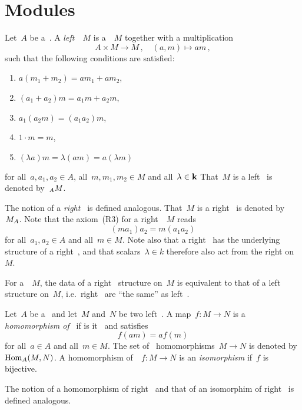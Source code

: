 \section{Modules}


\begin{definition}
  Let~$A$ be a~{\kalg}.
  A \emph{left~{}}~$M$ is a~{\module{$\kf$}}~$M$ together with a multiplication
  \[
            A \times M
    \to     M \,,
    \quad   (a,m)
    \mapsto am \,,
  \]
  such that the following conditions are satisfied:
  \begin{enumerate}[label={(L\arabic*})]
    \item
      $a(m_1 + m_2) = am_1 + am_2$,
    \item
      $(a_1 + a_2) m = a_1 m + a_2 m$,
    \item
      \label{module associative}
      $a_1 (a_2 m) = (a_1 a_2) m$,
    \item
      $1 \cdot m = m$,
    \item
      $(\lambda a)m = \lambda (am) = a (\lambda m)$
  \end{enumerate}
  for all~$a, a_1, a_2 \in A$, all~$m, m_1, m_2 \in M$ and all~$\lambda \in \mathbf{k}$
  That~$M$ is a left~{} is denoted by~$\indmodule[A]{M}$.
  
  The notion of a \emph{right~{}} is defined analogous.
  That~$M$ is a right~{} is denoted by~$\indmodule{M}[A]$.
  Note that the axiom~(R3) for a right~{}~$M$ reads
  \[
      (m a_1) a_2
    = m (a_1 a_2)
  \]
  for all~$a_1, a_2 \in A$ and all~$m \in M$.
  Note also that a right~{} has the underlying structure of a right~{\module{$\kf$}}, and that scalars~$\lambda \in k$ therefore also act from the right on~$M$.
\end{definition}


\begin{remark}
  For a~{\module{$\kf$}}~$M$, the data of a right~{} structure on~$M$ is equivalent to that of a left~{} structure on~$M$, i.e.\ right~{} are \enquote{the same} as left~{}.
\end{remark}


\begin{definition}
  Let~$A$ be a~{\kalg} and let~$M$ and~$N$ be two left~{}.
  A map~$f \colon M \to N$ is a \emph{homomorphism of~{}} if is it~{\klin} and satisfies
  \[
      f(am)
    = a f(m)
  \]
  for all~$a \in A$ and all~$m \in M$.
  The set of~{} homomorphisms~$M \to N$ is denoted by~$\operatorname{Hom}_A(M,N)$.
  A homomorphism of~{}~$f \colon M \to N$ is an \emph{isomorphism} if~$f$ is bijective.
  
  The notion of a homomorphism of right~{} and that of an isomorphim of right~{} is defined analogous.
\end{definition}


